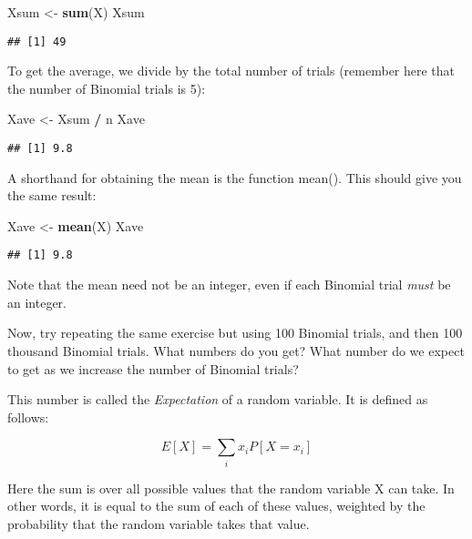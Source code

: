 \documentclass[
]{book}
\newenvironment{Shaded}{\begin{snugshade}}{\end{snugshade}}
\newcommand{\KeywordTok}[1]{\textcolor[rgb]{0.13,0.29,0.53}{\textbf{#1}}}
\newcommand{\NormalTok}[1]{#1}
\newcommand{\OperatorTok}[1]{\textcolor[rgb]{0.81,0.36,0.00}{\textbf{#1}}}
\newcommand{\StringTok}[1]{\textcolor[rgb]{0.31,0.60,0.02}{#1}}
\begin{document}
\begin{Shaded}
\begin{Highlighting}[]
\NormalTok{Xsum \textless{}{-}}\StringTok{ }\KeywordTok{sum}\NormalTok{(X)}
\NormalTok{Xsum}
\end{Highlighting}
\end{Shaded}

\begin{verbatim}
## [1] 49
\end{verbatim}

To get the average, we divide by the total number of trials (remember here that the number of Binomial trials is 5):

\begin{Shaded}
\begin{Highlighting}[]
\NormalTok{Xave \textless{}{-}}\StringTok{ }\NormalTok{Xsum }\OperatorTok{/}\StringTok{ }\NormalTok{n}
\NormalTok{Xave}
\end{Highlighting}
\end{Shaded}

\begin{verbatim}
## [1] 9.8
\end{verbatim}

A shorthand for obtaining the mean is the function mean(). This should give you the same result:

\begin{Shaded}
\begin{Highlighting}[]
\NormalTok{Xave \textless{}{-}}\StringTok{ }\KeywordTok{mean}\NormalTok{(X)}
\NormalTok{Xave}
\end{Highlighting}
\end{Shaded}

\begin{verbatim}
## [1] 9.8
\end{verbatim}

Note that the mean need not be an integer, even if each Binomial trial \emph{must} be an integer.

Now, try repeating the same exercise but using 100 Binomial trials, and then 100 thousand Binomial trials. What numbers do you get? What number do we expect to get as we increase the number of Binomial trials?

This number is called the \emph{Expectation} of a random variable. It is defined as follows:

\[E[X] = \sum_{i}x_iP[X=x_i]\]

Here the sum is over all possible values that the random variable X can take. In other words, it is equal to the sum of each of these values, weighted by the probability that the random variable takes that value.
\end{document}
